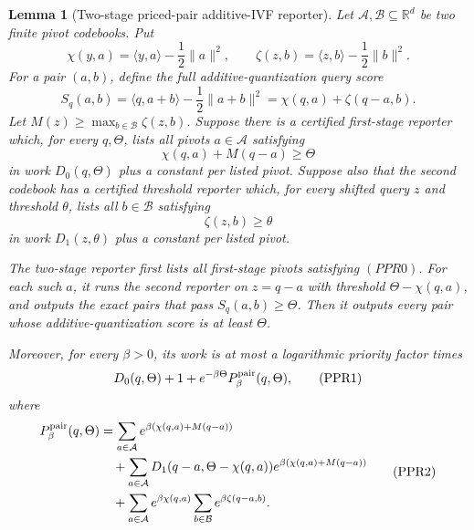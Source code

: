 \documentclass[10pt]{article}
\newtheorem{lemma}[theorem]{Lemma}
\theoremstyle{definition}
\newcommand{\ip}[2]{\langle #1,#2\rangle}
\begin{document}
\begin{lemma}[Two-stage priced-pair additive-IVF reporter]
   \label{lem:priced-pair-additive-ivf-reporter}
   Let \(\mathcal A,\mathcal B\subseteq\mathbb R^d\) be two finite pivot
   codebooks.  Put
   \[
      \chi(y,a)=\ip{y}{a}-\frac12\|a\|^2,
      \qquad
      \zeta(z,b)=\ip{z}{b}-\frac12\|b\|^2 .
   \]
   For a pair \((a,b)\), define the full additive-quantization query score
   \[
      S_q(a,b)
      =
      \ip{q}{a+b}-\frac12\|a+b\|^2
      =
      \chi(q,a)+\zeta(q-a,b).
      \tag{PAIR}
   \]
   Let \(M(z)\ge\max_{b\in\mathcal B}\zeta(z,b)\).  Suppose there is a
   certified first-stage reporter which, for every \(q,\Theta\), lists all
   pivots \(a\in\mathcal A\) satisfying
   \[
      \chi(q,a)+M(q-a)\ge\Theta
      \tag{PPR0}
   \]
   in work \(D_0(q,\Theta)\) plus a constant per listed pivot.  Suppose also
   that the second codebook has a certified threshold reporter which, for every
   shifted query \(z\) and threshold \(\theta\), lists all
   \(b\in\mathcal B\) satisfying
   \[
      \zeta(z,b)\ge\theta
   \]
   in work \(D_1(z,\theta)\) plus a constant per listed pivot.

   The two-stage reporter first lists all first-stage pivots satisfying
   \((PPR0)\).  For each such \(a\), it runs the second reporter on
   \(z=q-a\) with threshold \(\Theta-\chi(q,a)\), and outputs the exact pairs
   that pass \(S_q(a,b)\ge\Theta\).  Then it outputs every pair whose
   additive-quantization score is at least \(\Theta\).

   Moreover, for every \(\beta>0\), its work is at most a logarithmic priority
   factor times
   \[
      D_0(q,\Theta)+1
      +
      e^{-\beta\Theta}P_\beta^{\rm pair}(q,\Theta),
      \tag{PPR1}
   \]
   where
   \[
   \begin{aligned}
      P_\beta^{\rm pair}(q,\Theta)
      &=
      \sum_{a\in\mathcal A}
      e^{\beta(\chi(q,a)+M(q-a))}
      \\
      &\quad+
      \sum_{a\in\mathcal A}
      D_1(q-a,\Theta-\chi(q,a))
      e^{\beta(\chi(q,a)+M(q-a))}
      \\
      &\quad+
      \sum_{a\in\mathcal A}
      e^{\beta\chi(q,a)}
      \sum_{b\in\mathcal B}e^{\beta\zeta(q-a,b)} .
   \end{aligned}
   \tag{PPR2}
   \]
\end{lemma}
\end{document}
